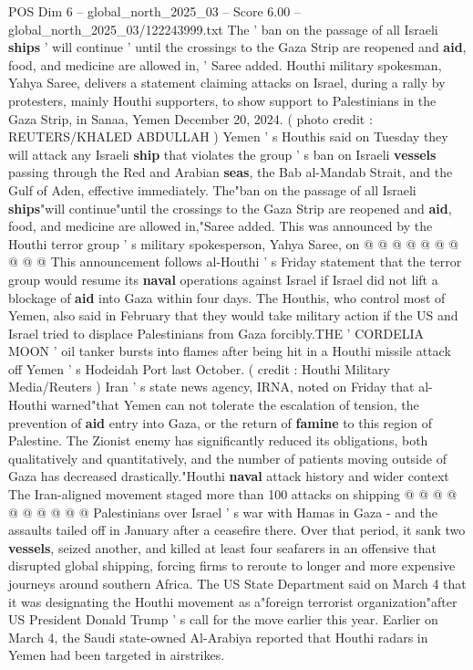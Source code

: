 \begin{textsample}{POS Dim 6 – global\_north\_2025\_03 – Score 6.00 – global\_north\_2025\_03/122243999.txt}  \label{ex:f6_pos_274}
The ' ban on the passage of all Israeli \textbf{ships} ' will continue ' until the crossings to the Gaza Strip are reopened and \textbf{aid}, food, and medicine are allowed in, ' Saree added.
Houthi military spokesman, Yahya Saree, delivers a statement claiming attacks on Israel, during a rally by protesters, mainly Houthi supporters, to show support to Palestinians in the Gaza Strip, in Sanaa, Yemen December 20, 2024. ( photo credit : REUTERS/KHALED ABDULLAH ) Yemen ' s Houthis said on Tuesday they will attack any Israeli \textbf{ship} that violates the group ' s ban on Israeli \textbf{vessels} passing through the Red and Arabian \textbf{seas}, the Bab al-Mandab Strait, and the Gulf of Aden, effective immediately.
The"ban on the passage of all Israeli \textbf{ships}"will continue"until the crossings to the Gaza Strip are reopened and \textbf{aid}, food, and medicine are allowed in,"Saree added.
This was announced by the Houthi terror group ' s military spokesperson, Yahya Saree, on @ @ @ @ @ @ @ @ @ @ This announcement follows al-Houthi ' s Friday statement that the terror group would resume its \textbf{naval} operations against Israel if Israel did not lift a blockage of \textbf{aid} into Gaza within four days.
The Houthis, who control most of Yemen, also said in February that they would take military action if the US and Israel tried to displace Palestinians from Gaza forcibly.THE ' CORDELIA MOON ' oil tanker bursts into flames after being hit in a Houthi missile attack off Yemen ' s Hodeidah Port last October. ( credit : Houthi Military Media/Reuters ) Iran ' s state news agency, IRNA, noted on Friday that al-Houthi warned"that Yemen can not tolerate the escalation of tension, the prevention of \textbf{aid} entry into Gaza, or the return of \textbf{famine} to this region of Palestine.
The Zionist enemy has significantly reduced its obligations, both qualitatively and quantitatively, and the number of patients moving outside of Gaza has decreased drastically."Houthi \textbf{naval} attack history and wider context The Iran-aligned movement staged more than 100 attacks on shipping @ @ @ @ @ @ @ @ @ @ Palestinians over Israel ' s war with Hamas in Gaza - and the assaults tailed off in January after a ceasefire there.
Over that period, it sank two \textbf{vessels}, seized another, and killed at least four seafarers in an offensive that disrupted global shipping, forcing firms to reroute to longer and more expensive journeys around southern Africa.
The US State Department said on March 4 that it was designating the Houthi movement as a"foreign terrorist organization"after US President Donald Trump ' s call for the move earlier this year.
Earlier on March 4, the Saudi state-owned Al-Arabiya reported that Houthi radars in Yemen had been targeted in airstrikes.

\end{textsample}
